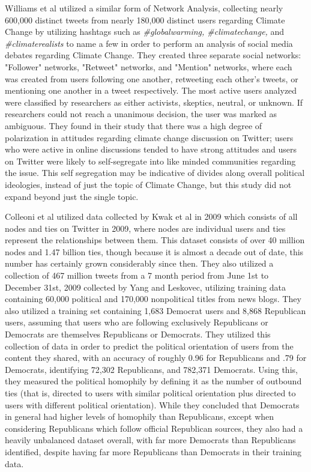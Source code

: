 \documentclass[journal]{IEEEtran}
\begin{document}
	Williams et al utilized a similar form of Network Analysis, collecting nearly 600,000 distinct tweets from nearly 180,000 distinct users regarding Climate Change by utilizing hashtags such as \textit{\#globalwarming, \#climatechange,} and \textit{\#climaterealists} to name a few in order to perform an analysis of social media debates regarding Climate Change. They created three separate social networks: "Follower" networks, "Retweet" networks, and "Mention" networks, where each was created from users following one another, retweeting each other's tweets, or mentioning one another in a tweet respectively. The most active users analyzed were classified by researchers as either activists, skeptics, neutral, or unknown. If researchers could not reach a unanimous decision, the user was marked as ambiguous. They found in their study that there was a high degree of polarization in attitudes regarding climate change discussion on Twitter; users who were active in online discussions tended to have strong attitudes and users on Twitter were likely to self-segregate into like minded communities regarding the issue. This self segregation may be indicative of divides along overall political ideologies, instead of just the topic of Climate Change, but this study did not expand beyond just the single topic. 
	
	Colleoni et al utilized data collected by Kwak et al in 2009 which consists of all nodes and ties on Twitter in 2009, where nodes are individual users and ties represent the relationships between them. This dataset consists of over 40 million nodes and 1.47 billion ties, though because it is almost a decade out of date, this number has certainly grown considerably since then. They also utilized a collection of 467 million tweets from a 7 month period from June 1st to December 31st, 2009 collected by Yang and Leskovec, utilizing training data containing 60,000 political and 170,000 nonpolitical titles from news blogs. They also utilized a training set containing 1,683 Democrat users and 8,868 Republican users, assuming that users who are following exclusively Republicans or Democrats are themselves Republicans or Democrats. They utilized this collection of data in order to predict the political orientation of users from the content they shared, with an accuracy of roughly 0.96 for Republicans and .79 for Democrats, identifying 72,302 Republicans, and 782,371 Democrats. Using this, they measured the political homophily by defining it as the number of outbound ties (that is, directed to users with similar political orientation plus directed to users with different political orientation). While they concluded that Democrats in general had higher levels of homophily than Republicans, except when considering Republicans which follow official Republican sources, they also had a heavily unbalanced dataset overall, with far more Democrats than Republicans identified, despite having far more Republicans than Democrats in their training data. 
	
\end{document}
